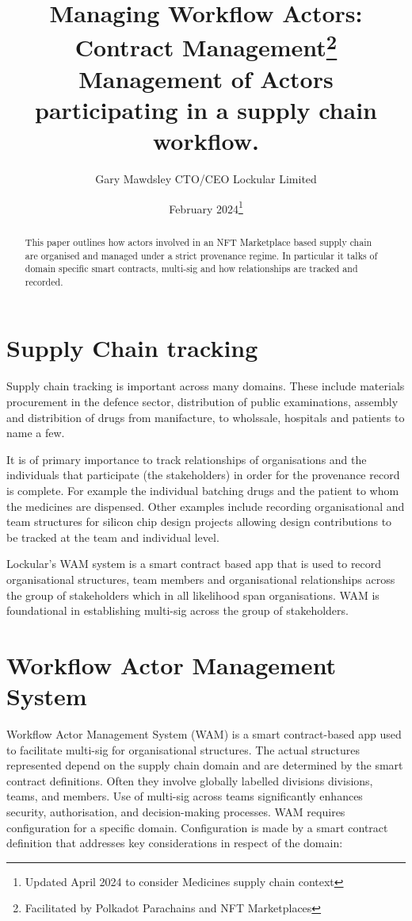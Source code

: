 \documentclass{tufte-handout}
\title{Managing Workflow Actors: Contract Management\thanks{Facilitated by Polkadot Parachains and NFT Marketplaces} \\
\large Management of Actors participating in a supply chain workflow.}
\author[Gary Mawdsley]{Gary Mawdsley CTO/CEO Lockular Limited}
\date{February 2024\thanks{Updated April 2024 to consider Medicines supply chain context}}    %
\begin{document}
\maketitle%

\begin{abstract}
\noindent This paper outlines how actors involved in an NFT Marketplace based supply chain are organised and managed under
a strict provenance regime. In particular it talks of domain specific smart contracts, multi-sig and how relationships are
tracked and recorded.

\end{abstract}

{}

\section{Supply Chain tracking}\label{sec:page-layout}
Supply chain tracking is important across many domains. These include materials procurement in the defence sector,
distribution of public examinations, assembly and distribition of drugs from manifacture, to wholssale, hospitals
and patients to name a few.

It is of primary importance to track relationships of organisations and the individuals that participate (the stakeholders) in order for the
provenance record is complete. For example the individual batching drugs and the patient to whom the medicines are dispensed.
Other examples include recording organisational and team  structures for silicon chip design projects allowing design contributions
to be tracked at the team and individual level.

Lockular's WAM system is a smart contract based app that is used to record organisational structures, team members and organisational
relationships across the group of stakeholders which in all likelihood span organisations. WAM is foundational in establishing multi-sig
across the group of stakeholders.

\section{Workflow Actor Management System}\label{sec:page-layout}
Workflow Actor Management System (WAM) is a smart contract-based app used to facilitate multi-sig for organisational structures. The actual structures
represented depend on the supply chain domain and are determined by the smart contract definitions. Often they involve globally labelled divisions divisions,
teams, and members. Use of multi-sig across teams significantly enhances security, authorisation, and decision-making processes. WAM requires configuration for a
specific domain. Configuration is made by a smart contract definition that addresses key considerations in respect of the domain:
\end{document}
